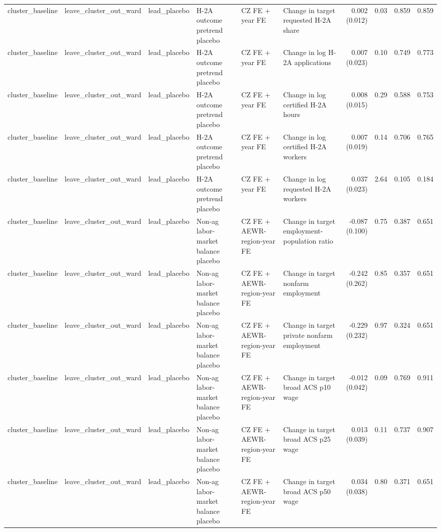 \begin{tabular}{llllllrrrr}
cluster_baseline & leave_cluster_out_ward & lead_placebo & H-2A outcome pretrend placebo & CZ FE + year FE & Change in target requested H-2A share & 0.002 (0.012) & 0.03 & 0.859 & 0.859 \\
cluster_baseline & leave_cluster_out_ward & lead_placebo & H-2A outcome pretrend placebo & CZ FE + year FE & Change in log H-2A applications & 0.007 (0.023) & 0.10 & 0.749 & 0.773 \\
cluster_baseline & leave_cluster_out_ward & lead_placebo & H-2A outcome pretrend placebo & CZ FE + year FE & Change in log certified H-2A hours & 0.008 (0.015) & 0.29 & 0.588 & 0.753 \\
cluster_baseline & leave_cluster_out_ward & lead_placebo & H-2A outcome pretrend placebo & CZ FE + year FE & Change in log certified H-2A workers & 0.007 (0.019) & 0.14 & 0.706 & 0.765 \\
cluster_baseline & leave_cluster_out_ward & lead_placebo & H-2A outcome pretrend placebo & CZ FE + year FE & Change in log requested H-2A workers & 0.037 (0.023) & 2.64 & 0.105 & 0.184 \\
cluster_baseline & leave_cluster_out_ward & lead_placebo & Non-ag labor-market balance placebo & CZ FE + AEWR-region-year FE & Change in target employment-population ratio & -0.087 (0.100) & 0.75 & 0.387 & 0.651 \\
cluster_baseline & leave_cluster_out_ward & lead_placebo & Non-ag labor-market balance placebo & CZ FE + AEWR-region-year FE & Change in target nonfarm employment & -0.242 (0.262) & 0.85 & 0.357 & 0.651 \\
cluster_baseline & leave_cluster_out_ward & lead_placebo & Non-ag labor-market balance placebo & CZ FE + AEWR-region-year FE & Change in target private nonfarm employment & -0.229 (0.232) & 0.97 & 0.324 & 0.651 \\
cluster_baseline & leave_cluster_out_ward & lead_placebo & Non-ag labor-market balance placebo & CZ FE + AEWR-region-year FE & Change in target broad ACS p10 wage & -0.012 (0.042) & 0.09 & 0.769 & 0.911 \\
cluster_baseline & leave_cluster_out_ward & lead_placebo & Non-ag labor-market balance placebo & CZ FE + AEWR-region-year FE & Change in target broad ACS p25 wage & 0.013 (0.039) & 0.11 & 0.737 & 0.907 \\
cluster_baseline & leave_cluster_out_ward & lead_placebo & Non-ag labor-market balance placebo & CZ FE + AEWR-region-year FE & Change in target broad ACS p50 wage & 0.034 (0.038) & 0.80 & 0.371 & 0.651 \\

\end{tabular}
